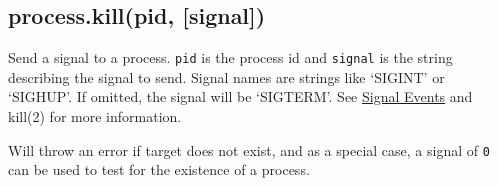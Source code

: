 \begin{Shaded}
\begin{Highlighting}[]
\NormalTok{\{ }\NormalTok{:}
   \NormalTok{\{ }\NormalTok{: [],}
     \NormalTok{: }\NormalTok{,}
     \NormalTok{: [],}
     \NormalTok{: [],}
     \NormalTok{: [] \},}
  \NormalTok{:}
   \NormalTok{\{ }\NormalTok{: }\NormalTok{,}
     \NormalTok{: }\NormalTok{,}
     \NormalTok{: }\NormalTok{,}
     \NormalTok{: }\NormalTok{,}
     \NormalTok{: }\NormalTok{,}
     \NormalTok{: }\NormalTok{,}
     \NormalTok{: }\NormalTok{,}
     \NormalTok{: }\NormalTok{,}
     \NormalTok{: }\NormalTok{,}
     \NormalTok{: }\NormalTok{,}
     \NormalTok{: }\NormalTok{,}
     \NormalTok{: }\NormalTok{,}
     \NormalTok{: }\NormalTok{,}
     \NormalTok{: } \NormalTok{\} \}}
\end{Highlighting}
\end{Shaded}

\subsection{process.kill(pid,
{[}signal{]})}\label{process.killpid-signal}

Send a signal to a process. \texttt{pid} is the process id and
\texttt{signal} is the string describing the signal to send. Signal
names are strings like `SIGINT' or `SIGHUP'. If omitted, the signal will
be `SIGTERM'. See \hyperref[processux5fsignalux5fevents]{Signal Events}
and kill(2) for more information.

Will throw an error if target does not exist, and as a special case, a
signal of \texttt{0} can be used to test for the existence of a process.

